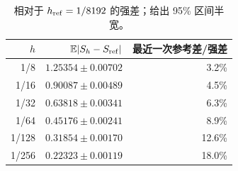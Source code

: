 \begin{table}[H]\centering\small
\caption{相对于 $h_{\rm ref}=1/8192$ 的强差；给出 95\% 区间半宽。}\label{tab:na-strong-cn}
\begin{tabular}{rrr}\toprule
$h$ & $\mathbb E|S_h-S_{\rm ref}|$ & 最近一次参考差/强差\\\midrule
1/8 & $1.25354\pm0.00702$ & 3.2\%\\
1/16 & $0.90087\pm0.00489$ & 4.5\%\\
1/32 & $0.63818\pm0.00341$ & 6.3\%\\
1/64 & $0.45176\pm0.00241$ & 8.9\%\\
1/128 & $0.31854\pm0.00170$ & 12.6\%\\
1/256 & $0.22323\pm0.00119$ & 18.0\%\\
\bottomrule\end{tabular}
\end{table}
